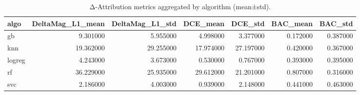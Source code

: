 \begin{table}
\caption{Δ-Attribution metrics aggregated by algorithm (mean±std).}
\label{tab:delta_summary_by_algo}
\begin{tabular}{lrrrrrr}
\toprule
algo & DeltaMag\_L1\_mean & DeltaMag\_L1\_std & DCE\_mean & DCE\_std & BAC\_mean & BAC\_std \\
\midrule
gb & 9.301000 & 5.955000 & 4.998000 & 3.377000 & 0.172000 & 0.387000 \\
knn & 19.362000 & 29.255000 & 17.974000 & 27.197000 & 0.420000 & 0.367000 \\
logreg & 4.243000 & 3.673000 & 0.530000 & 0.767000 & 0.393000 & 0.395000 \\
rf & 36.229000 & 25.935000 & 29.612000 & 21.201000 & 0.807000 & 0.316000 \\
svc & 2.186000 & 4.003000 & 0.939000 & 2.148000 & 0.441000 & 0.463000 \\
\bottomrule
\end{tabular}
\end{table}
